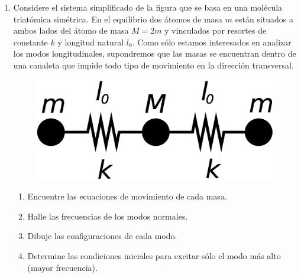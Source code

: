 \documentclass[11pt,spanish,a4paper]{article}
\begin{document}
\begin{enumerate}
\item Considere el sistema simplificado de la figura que se basa en una molécula triatómica simétrica.
En el equilibrio dos átomos de masa $m$ están situados a ambos lados del átomo de masa $M=2m$ y vinculados por resortes de constante $k$ y longitud natural $l_0$.
Como sólo estamos interesados en analizar los modos longitudinales, supondremos que las masas se encuentran dentro de una canaleta que impide todo tipo de movimiento en la dirección transversal. 
\begin{figure}[H]
\centering{}\includegraphics[clip,scale=0.25]{ej1-9}
\end{figure}
\begin{enumerate}
	\item Encuentre las ecuaciones de movimiento de cada masa. 
	\item Halle las frecuencias de los modos normales. 
	\item Dibuje las configuraciones de cada modo. 
	\item Determine las condiciones iniciales para excitar sólo el modo más alto (mayor frecuencia).
\end{enumerate}



\end{enumerate}
\end{document}
